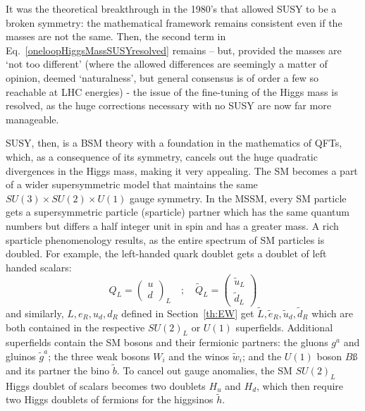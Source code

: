 It was the theoretical breakthrough in the 1980's that allowed \ac{SUSY} to be a broken symmetry: 
the mathematical framework remains consistent even if the masses are not the same.
Then, the second term in Eq.~\ref{oneloopHiggsMassSUSYresolved} remains -- 
but, provided the masses are `not too different' 
(where the allowed differences are seemingly a matter of opinion, deemed `naturalness', but general consensus is of order a few \TeV so reachable at \ac{LHC} energies) 
- the issue of the fine-tuning of the Higgs mass is resolved, as the huge corrections necessary with no \ac{SUSY} are now far more manageable.

\ac{SUSY}, then, is a \ac{BSM} theory with a foundation in the mathematics of \ac{QFT}s, which, as a consequence of its symmetry, cancels out the huge quadratic divergences in the Higgs mass, making it very appealing. 
The \ac{SM} becomes a part of a wider supersymmetric model that maintains the same $SU(3)\times SU(2) \times U(1)$ gauge symmetry. 
In the \ac{MSSM}, every \ac{SM} particle gets a supersymmetric particle (sparticle) partner which has the same quantum numbers but differs a half integer unit in spin and has a greater mass. 
A rich sparticle phenomenology results, as the entire spectrum of \ac{SM} particles is doubled.
For example, the left-handed quark doublet gets a doublet of left handed scalars:
\begin{equation}
Q_{L} = \left(  
 \begin{array}{c}
 u \\
 d 
 \end{array} 
 \right)_{L}
 \hspace{1em}; \hspace{1em}
 \tilde{Q}_{L} = \left(  
 \begin{array}{c}
 \tilde{u}_{L} \\
 \tilde{d}_{L} 
 \end{array} 
 \right)
\end{equation}
and similarly, $L, e_{R}, u_{d}, d_{R}$ defined in Section~\ref{th:EW} get $\tilde{L}, \tilde{e}_{R}, \tilde{u}_{d}, \tilde{d}_{R}$ which are both contained in the respective $SU(2)_{L}$ or $U(1)$ superfields.
Additional superfields contain the \ac{SM} bosons and their fermionic partners: the gluons $g^{a}$ and gluinos $\tilde{g}^{a}$; the three weak bosons $W_{i}$ and the winos $\tilde{w}_{i}$; and the $U(1)$ boson $B$ß and its partner the bino $\tilde{b}$. 
To cancel out gauge anomalies, the \ac{SM} $SU(2)_{L}$ Higgs doublet of scalars becomes two doublets $H_{u}$ and $H_{d}$, which then require two Higgs doublets of fermions for the higgsinos $\tilde{h}$. 


